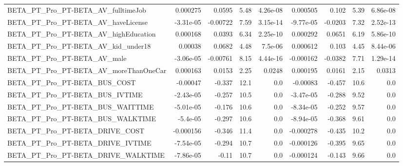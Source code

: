 \begin{tabular}{lrrrrrrrr}
BETA\_PT\_Pro\_PT-BETA\_AV\_fulltimeJob                 &    0.000275 &       0.0595 &      5.48 & 4.26e-08 &   0.000505 &       0.102 &         5.39 &      6.86e-08 \\
BETA\_PT\_Pro\_PT-BETA\_AV\_haveLicense                 &   -3.31e-05 &     -0.00722 &      7.59 & 3.15e-14 &  -9.77e-05 &     -0.0203 &         7.32 &      2.52e-13 \\
BETA\_PT\_Pro\_PT-BETA\_AV\_highEducation               &    0.000168 &       0.0393 &      6.34 & 2.25e-10 &   0.000292 &      0.0651 &         6.19 &      5.86e-10 \\
BETA\_PT\_Pro\_PT-BETA\_AV\_kid\_under18                 &     0.00038 &       0.0682 &      4.48 &  7.5e-06 &   0.000612 &       0.103 &         4.45 &      8.44e-06 \\
BETA\_PT\_Pro\_PT-BETA\_AV\_male                        &   -3.06e-05 &     -0.00761 &      8.15 & 4.44e-16 &  -0.000162 &     -0.0382 &         7.71 &      1.29e-14 \\
BETA\_PT\_Pro\_PT-BETA\_AV\_moreThanOneCar              &    0.000163 &       0.0153 &      2.25 &   0.0248 &   0.000195 &      0.0161 &         2.15 &        0.0313 \\
BETA\_PT\_Pro\_PT-BETA\_BUS\_COST                       &    -0.00047 &       -0.337 &      12.1 &      0.0 &   -0.00083 &      -0.457 &         10.6 &           0.0 \\
BETA\_PT\_Pro\_PT-BETA\_BUS\_IVTIME                     &   -2.43e-05 &       -0.257 &      10.5 &      0.0 &  -3.47e-05 &      -0.288 &         9.52 &           0.0 \\
BETA\_PT\_Pro\_PT-BETA\_BUS\_WAITTIME                   &   -5.01e-05 &       -0.176 &      10.6 &      0.0 &  -8.34e-05 &      -0.252 &         9.57 &           0.0 \\
BETA\_PT\_Pro\_PT-BETA\_BUS\_WALKTIME                   &    -5.4e-05 &       -0.297 &      10.6 &      0.0 &  -8.94e-05 &      -0.368 &         9.61 &           0.0 \\
BETA\_PT\_Pro\_PT-BETA\_DRIVE\_COST                     &   -0.000156 &       -0.346 &      11.4 &      0.0 &  -0.000278 &      -0.435 &         10.2 &           0.0 \\
BETA\_PT\_Pro\_PT-BETA\_DRIVE\_IVTIME                   &   -7.54e-05 &       -0.294 &      10.7 &      0.0 &  -0.000126 &      -0.395 &         9.65 &           0.0 \\
BETA\_PT\_Pro\_PT-BETA\_DRIVE\_WALKTIME                 &   -7.86e-05 &        -0.11 &      10.7 &      0.0 &  -0.000124 &      -0.143 &         9.66 &           0.0 \\

\end{tabular}
